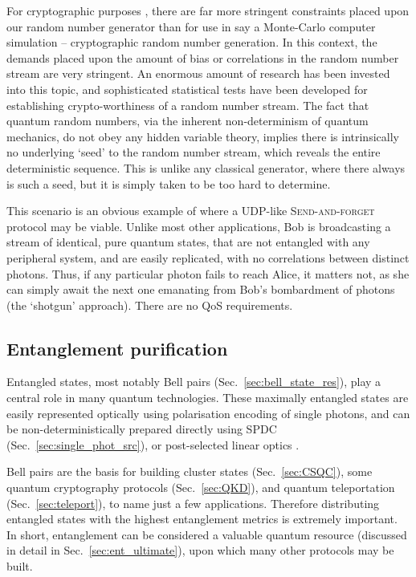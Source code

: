 For cryptographic purposes , there are far more stringent constraints placed upon our random number generator than for use in say a Monte-Carlo computer simulation -- cryptographic random number generation. In this context, the demands placed upon the amount of bias or correlations in the random number stream are very stringent. An enormous amount of research has been invested into this topic, and sophisticated statistical tests have been developed for establishing crypto-worthiness of a random number stream. The fact that quantum random numbers, via the inherent non-determinism of quantum mechanics, do not obey any hidden variable theory, implies there is intrinsically no underlying `seed' to the random number stream, which reveals the entire deterministic sequence. This is unlike any classical generator, where there always is such a seed, but it is simply taken to be too hard to determine.

This scenario is an obvious example of where a UDP-like \textsc{Send-and-forget} protocol may be viable. Unlike most other applications, Bob is broadcasting a stream of identical, pure quantum states, that are not entangled with any peripheral system, and are easily replicated, with no correlations between distinct photons. Thus, if any particular photon fails to reach Alice, it matters not, as she can simply await the next one emanating from Bob's bombardment of photons (the `shotgun' approach). There are no QoS requirements.

%
%

\subsection{Entanglement purification} \label{sec:ent_purif} 

Entangled states, most notably Bell pairs (Sec.~\ref{sec:bell_state_res}), play a central role in many quantum technologies. These maximally entangled states are easily represented optically using polarisation encoding of single photons, and can be non-deterministically prepared directly using SPDC (Sec.~\ref{sec:single_phot_src}), or post-selected linear optics \cite{???}.

Bell pairs are the basis for building cluster states (Sec.~\ref{sec:CSQC}), some quantum cryptography protocols (Sec.~\ref{sec:QKD}), and quantum teleportation (Sec.~\ref{sec:teleport}), to name just a few applications. Therefore distributing entangled states with the highest entanglement metrics is extremely important. In short, entanglement can be considered a valuable quantum resource (discussed in detail in Sec.~\ref{sec:ent_ultimate}), upon which many other protocols may be built.

